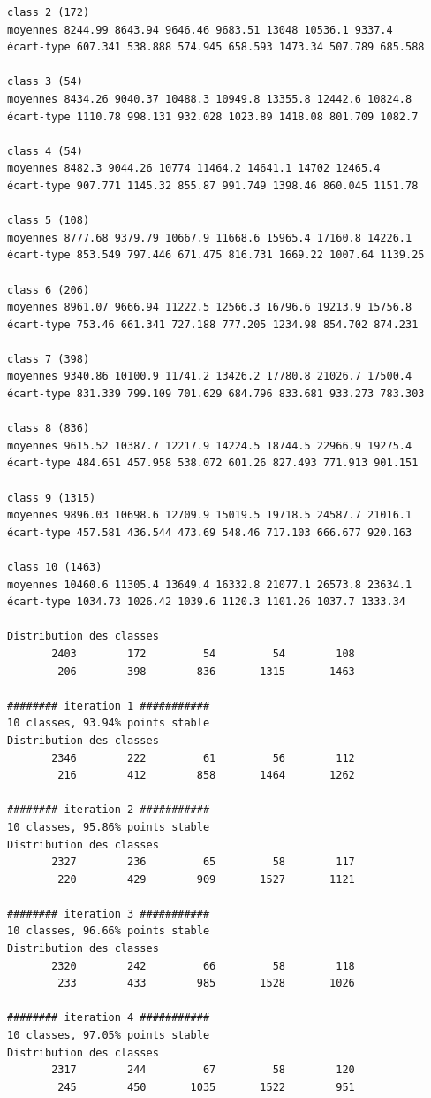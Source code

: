 \documentclass[earth,article,submit,pdftex,moreauthors]{Definitions/mdpi}
\begin{document}
\begin{scriptsize}
\begin{verbatim}
class 2 (172)
moyennes 8244.99 8643.94 9646.46 9683.51 13048 10536.1 9337.4
écart-type 607.341 538.888 574.945 658.593 1473.34 507.789 685.588

class 3 (54)
moyennes 8434.26 9040.37 10488.3 10949.8 13355.8 12442.6 10824.8
écart-type 1110.78 998.131 932.028 1023.89 1418.08 801.709 1082.7

class 4 (54)
moyennes 8482.3 9044.26 10774 11464.2 14641.1 14702 12465.4
écart-type 907.771 1145.32 855.87 991.749 1398.46 860.045 1151.78

class 5 (108)
moyennes 8777.68 9379.79 10667.9 11668.6 15965.4 17160.8 14226.1
écart-type 853.549 797.446 671.475 816.731 1669.22 1007.64 1139.25

class 6 (206)
moyennes 8961.07 9666.94 11222.5 12566.3 16796.6 19213.9 15756.8
écart-type 753.46 661.341 727.188 777.205 1234.98 854.702 874.231

class 7 (398)
moyennes 9340.86 10100.9 11741.2 13426.2 17780.8 21026.7 17500.4
écart-type 831.339 799.109 701.629 684.796 833.681 933.273 783.303

class 8 (836)
moyennes 9615.52 10387.7 12217.9 14224.5 18744.5 22966.9 19275.4
écart-type 484.651 457.958 538.072 601.26 827.493 771.913 901.151

class 9 (1315)
moyennes 9896.03 10698.6 12709.9 15019.5 19718.5 24587.7 21016.1
écart-type 457.581 436.544 473.69 548.46 717.103 666.677 920.163

class 10 (1463)
moyennes 10460.6 11305.4 13649.4 16332.8 21077.1 26573.8 23634.1
écart-type 1034.73 1026.42 1039.6 1120.3 1101.26 1037.7 1333.34

Distribution des classes
       2403        172         54         54        108
        206        398        836       1315       1463

######## iteration 1 ###########
10 classes, 93.94% points stable
Distribution des classes
       2346        222         61         56        112
        216        412        858       1464       1262

######## iteration 2 ###########
10 classes, 95.86% points stable
Distribution des classes
       2327        236         65         58        117
        220        429        909       1527       1121

######## iteration 3 ###########
10 classes, 96.66% points stable
Distribution des classes
       2320        242         66         58        118
        233        433        985       1528       1026

######## iteration 4 ###########
10 classes, 97.05% points stable
Distribution des classes
       2317        244         67         58        120
        245        450       1035       1522        951


\end{verbatim}
\end{scriptsize}
\end{document}
